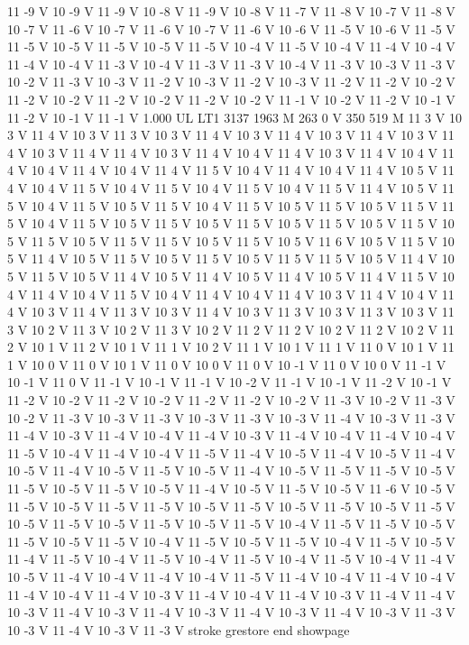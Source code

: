 {11 -9 V
10 -9 V
11 -9 V
10 -8 V
11 -9 V
10 -8 V
11 -7 V
11 -8 V
10 -7 V
11 -8 V
10 -7 V
11 -6 V
10 -7 V
11 -6 V
10 -7 V
11 -6 V
10 -6 V
11 -5 V
10 -6 V
11 -5 V
11 -5 V
10 -5 V
11 -5 V
10 -5 V
11 -5 V
10 -4 V
11 -5 V
10 -4 V
11 -4 V
10 -4 V
11 -4 V
10 -4 V
11 -3 V
10 -4 V
11 -3 V
11 -3 V
10 -4 V
11 -3 V
10 -3 V
11 -3 V
10 -2 V
11 -3 V
10 -3 V
11 -2 V
10 -3 V
11 -2 V
10 -3 V
11 -2 V
11 -2 V
10 -2 V
11 -2 V
10 -2 V
11 -2 V
10 -2 V
11 -2 V
10 -2 V
11 -1 V
10 -2 V
11 -2 V
10 -1 V
11 -2 V
10 -1 V
11 -1 V
1.000 UL
LT1
3137 1963 M
263 0 V
350 519 M
11 3 V
10 3 V
11 4 V
10 3 V
11 3 V
10 3 V
11 4 V
10 3 V
11 4 V
10 3 V
11 4 V
10 3 V
11 4 V
10 3 V
11 4 V
11 4 V
10 3 V
11 4 V
10 4 V
11 4 V
10 3 V
11 4 V
10 4 V
11 4 V
10 4 V
11 4 V
10 4 V
11 4 V
11 5 V
10 4 V
11 4 V
10 4 V
11 4 V
10 5 V
11 4 V
10 4 V
11 5 V
10 4 V
11 5 V
10 4 V
11 5 V
10 4 V
11 5 V
11 4 V
10 5 V
11 5 V
10 4 V
11 5 V
10 5 V
11 5 V
10 4 V
11 5 V
10 5 V
11 5 V
10 5 V
11 5 V
11 5 V
10 4 V
11 5 V
10 5 V
11 5 V
10 5 V
11 5 V
10 5 V
11 5 V
10 5 V
11 5 V
10 5 V
11 5 V
10 5 V
11 5 V
11 5 V
10 5 V
11 5 V
10 5 V
11 6 V
10 5 V
11 5 V
10 5 V
11 4 V
10 5 V
11 5 V
10 5 V
11 5 V
10 5 V
11 5 V
11 5 V
10 5 V
11 4 V
10 5 V
11 5 V
10 5 V
11 4 V
10 5 V
11 4 V
10 5 V
11 4 V
10 5 V
11 4 V
11 5 V
10 4 V
11 4 V
10 4 V
11 5 V
10 4 V
11 4 V
10 4 V
11 4 V
10 3 V
11 4 V
10 4 V
11 4 V
10 3 V
11 4 V
11 3 V
10 3 V
11 4 V
10 3 V
11 3 V
10 3 V
11 3 V
10 3 V
11 3 V
10 2 V
11 3 V
10 2 V
11 3 V
10 2 V
11 2 V
11 2 V
10 2 V
11 2 V
10 2 V
11 2 V
10 1 V
11 2 V
10 1 V
11 1 V
10 2 V
11 1 V
10 1 V
11 1 V
11 0 V
10 1 V
11 1 V
10 0 V
11 0 V
10 1 V
11 0 V
10 0 V
11 0 V
10 -1 V
11 0 V
10 0 V
11 -1 V
10 -1 V
11 0 V
11 -1 V
10 -1 V
11 -1 V
10 -2 V
11 -1 V
10 -1 V
11 -2 V
10 -1 V
11 -2 V
10 -2 V
11 -2 V
10 -2 V
11 -2 V
11 -2 V
10 -2 V
11 -3 V
10 -2 V
11 -3 V
10 -2 V
11 -3 V
10 -3 V
11 -3 V
10 -3 V
11 -3 V
10 -3 V
11 -4 V
10 -3 V
11 -3 V
11 -4 V
10 -3 V
11 -4 V
10 -4 V
11 -4 V
10 -3 V
11 -4 V
10 -4 V
11 -4 V
10 -4 V
11 -5 V
10 -4 V
11 -4 V
10 -4 V
11 -5 V
11 -4 V
10 -5 V
11 -4 V
10 -5 V
11 -4 V
10 -5 V
11 -4 V
10 -5 V
11 -5 V
10 -5 V
11 -4 V
10 -5 V
11 -5 V
11 -5 V
10 -5 V
11 -5 V
10 -5 V
11 -5 V
10 -5 V
11 -4 V
10 -5 V
11 -5 V
10 -5 V
11 -6 V
10 -5 V
11 -5 V
10 -5 V
11 -5 V
11 -5 V
10 -5 V
11 -5 V
10 -5 V
11 -5 V
10 -5 V
11 -5 V
10 -5 V
11 -5 V
10 -5 V
11 -5 V
10 -5 V
11 -5 V
10 -4 V
11 -5 V
11 -5 V
10 -5 V
11 -5 V
10 -5 V
11 -5 V
10 -4 V
11 -5 V
10 -5 V
11 -5 V
10 -4 V
11 -5 V
10 -5 V
11 -4 V
11 -5 V
10 -4 V
11 -5 V
10 -4 V
11 -5 V
10 -4 V
11 -5 V
10 -4 V
11 -4 V
10 -5 V
11 -4 V
10 -4 V
11 -4 V
10 -4 V
11 -5 V
11 -4 V
10 -4 V
11 -4 V
10 -4 V
11 -4 V
10 -4 V
11 -4 V
10 -3 V
11 -4 V
10 -4 V
11 -4 V
10 -3 V
11 -4 V
11 -4 V
10 -3 V
11 -4 V
10 -3 V
11 -4 V
10 -3 V
11 -4 V
10 -3 V
11 -4 V
10 -3 V
11 -3 V
10 -3 V
11 -4 V
10 -3 V
11 -3 V
stroke
grestore
end
showpage
}

